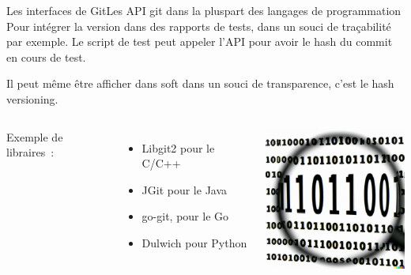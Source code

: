\documentclass{beamer}
\begin{document}
    \begin{frame}{Les interfaces de Git}{Les API git dans la pluspart des langages de programmation}
        \transdissolve
        Pour intégrer la version dans des rapports de tests, dans un souci de traçabilité par exemple.
        Le script de test peut appeler l'API pour avoir le hash du commit en cours de test.

        Il peut même être afficher dans soft dans un souci de transparence, c'est le hash versioning.
        \bigbreak
        \begin{columns}
            Exemple de libraires~:
            \begin{itemize}
                \item Libgit2 pour le C/C++
                \item JGit pour le Java
                \item go-git, pour le Go
                \item Dulwich pour Python
            \end{itemize}
            \centering
            \includegraphics[width=5cm]{image/code-scrutiny}
        \end{columns}
    \end{frame}
\end{document}

